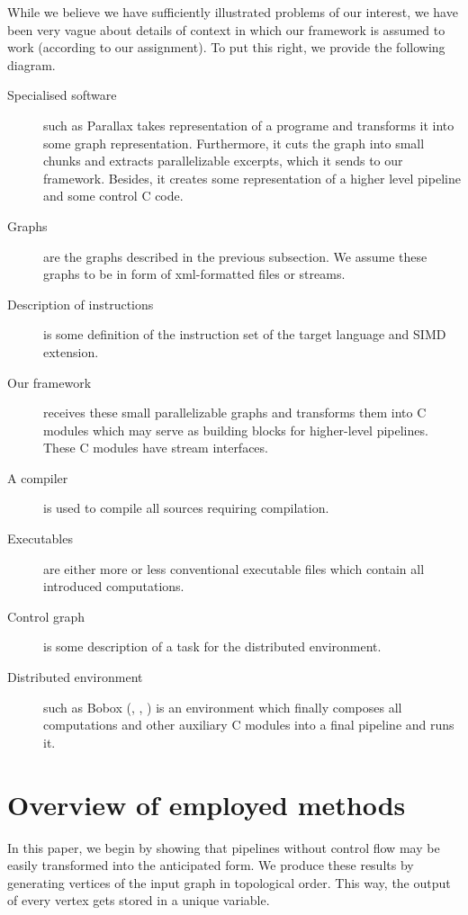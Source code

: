   While we believe we have sufficiently illustrated problems of our interest, we have been very vague about details of context in which our framework is assumed to work (according to our assignment). To put this right, we provide the following diagram.


\begin{description}
  \item[Specialised software] such as Parallax takes representation of a programe and transforms it into some graph representation. Furthermore, it cuts the graph into small chunks and extracts parallelizable excerpts, which it sends to our framework. Besides, it creates some representation of a higher level pipeline and some control C code.
  \item[Graphs] are the graphs described in the previous subsection. We assume these graphs to be in form of xml-formatted files or streams.
  \item[Description of instructions] is some definition of the instruction set of the target language and SIMD extension. 
  \item[Our framework] receives these small parallelizable graphs and transforms them into C modules which may serve as building blocks for higher-level pipelines. These C modules have stream interfaces.
  \item[A compiler] is used to compile all sources requiring compilation.
  \item[Executables] are either more or less conventional executable files which contain all introduced computations.
  \item[Control graph] is some description of a task for the distributed environment.
  \item[Distributed environment] such as Bobox (\cite{bobox}, \cite{pipelines}, \cite{hfg}) is an environment which finally composes all computations and other auxiliary C modules into a final pipeline and runs it. 
\end{description}

\section{Overview of employed methods}

In this paper, we begin by showing that pipelines without control flow may be easily transformed into the anticipated form. We produce these results by generating vertices of the input graph in topological order. This way, the output of every vertex gets stored in a unique variable. 

